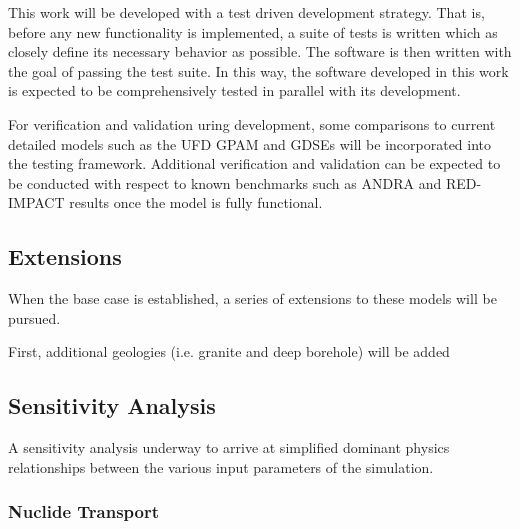    
  This work will be developed with a test driven development strategy. That is, 
  before any new functionality is implemented, a suite of tests is written which 
  as closely define its necessary behavior as possible. The software is then 
  written with the goal of passing the test suite. In this way, the software 
  developed in this work is expected to be comprehensively tested in parallel 
  with its development. 


  For verification and validation uring development, some comparisons to current 
  detailed models such as the \gls{UFD} \gls{GPAM} and GDSEs will be 
  incorporated into the testing framework. Additional verification and 
  validation can be expected to be conducted with respect to known benchmarks 
  such as \gls{ANDRA} and RED-IMPACT results once the model is fully functional.


\subsection{Extensions}



When the base case is established, a series of extensions to these models will 
be pursued. 

First, additional geologies (i.e. granite and deep borehole) will be added 









\subsection{Sensitivity Analysis}

A sensitivity analysis underway to arrive at simplified dominant physics 
relationships between the various input parameters of the simulation. 

\subsubsection{Nuclide Transport}

